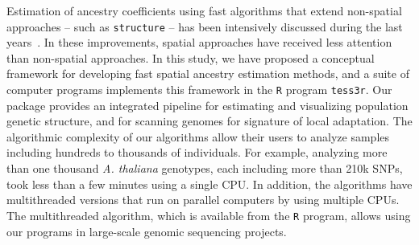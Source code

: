 Estimation of ancestry coefficients using fast algorithms that extend non-spatial approaches -- such as {\tt structure} -- has been intensively discussed during the last years~\citep{Wollstein2015}. In these improvements, spatial approaches have received less attention than non-spatial approaches. In this study, we have proposed a conceptual framework for developing fast spatial ancestry estimation methods, and a suite of computer programs implements this framework in the {\tt R} program {\tt tess3r}. Our package provides an integrated pipeline for estimating and visualizing population genetic structure,  and for scanning genomes for signature of local adaptation. The algorithmic complexity of our algorithms allow their users to analyze samples including hundreds to thousands of individuals. For example, analyzing more than one thousand {\it A. thaliana} genotypes, each including more than 210k SNPs, took less than a few minutes using a single CPU. In addition, the algorithms have multithreaded versions that run on parallel computers by using multiple CPUs. The multithreaded algorithm, which is available from the {\tt R} program, allows using our programs in large-scale genomic sequencing projects. 


